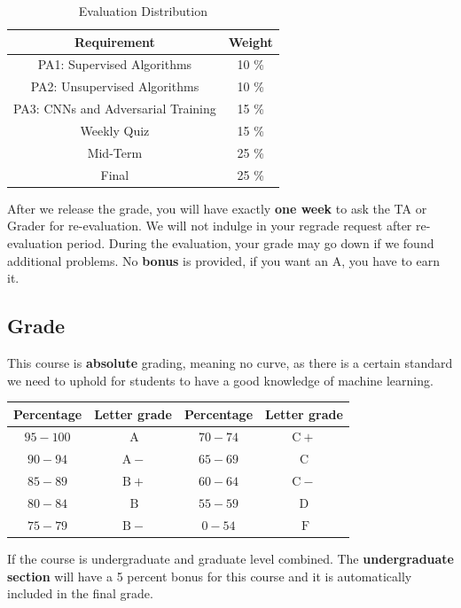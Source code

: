 \documentclass{article}
\begin{document}
\begin{table}[htbp]
    \centering
    \begin{tabular}{|c|c|}
        \hline
        \textbf{Requirement}               & \textbf{Weight} \\
        \hline
        PA1: Supervised Algorithms         & 10 \%           \\
        \hline
        PA2: Unsupervised Algorithms       & 10 \%           \\
        \hline
        PA3: CNNs and Adversarial Training & 15 \%           \\
        \hline
        Weekly Quiz                        & 15 \%           \\
        \hline
        Mid-Term                           & 25 \%           \\
        \hline
        Final                              & 25 \%           \\
        \hline
    \end{tabular}
    \caption{Evaluation Distribution}
\end{table}
After we release the grade, you will have exactly \textbf{one week} to ask the TA or Grader for re-evaluation.  We will not indulge in your regrade request after re-evaluation period. During the evaluation, your grade may go down if we found additional problems. No \textbf{bonus} is provided, if you want an A, you have to earn it.

\subsection{Grade}
This course is \textbf{absolute} grading, meaning no curve, as there is a certain standard we need to uphold for students to have a good knowledge of machine learning.
\begin{table}[htbp]
    \centering
    \begin{tabular}{|c|c|c|c|}\hline \textbf{Percentage} & \textbf{Letter grade} & \textbf{Percentage} & \textbf{Letter grade} \\ \hline \(95-100\) & \(\mathrm{~A}\) & \(70-74\) & \(\mathrm{C}+\) \\ \hline \(90-94\) & \(\mathrm{~A}-\) & \(65-69\) & \(\mathrm{C}\) \\ \hline \(85-89\) & \(\mathrm{~B}+\) & \(60-64\) & \(\mathrm{C}-\) \\ \hline \(80-84\) & \(\mathrm{~B}\) & \(55-59\) & \(\mathrm{D}\) \\ \hline \(75-79\) & \(\mathrm{~B}-\) & \(0-54\) & \(\mathrm{~F}\) \\ \hline\end{tabular}
\end{table}
If the course is undergraduate and graduate level combined. The \textbf{undergraduate section} will have a 5 percent bonus for this course and it is automatically included in the final grade.
\end{document}
